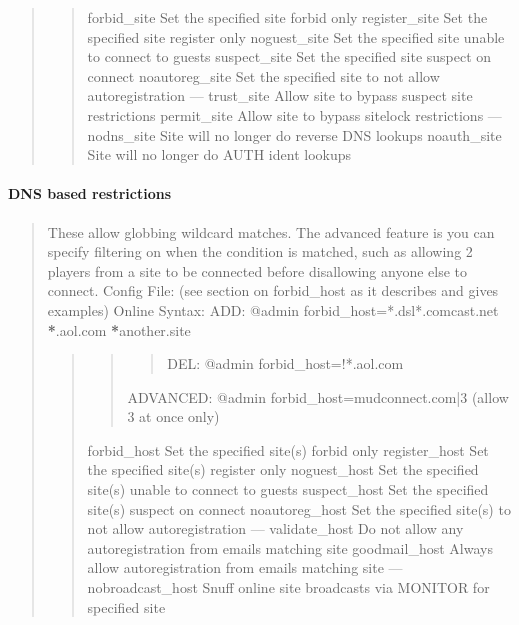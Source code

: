 \documentclass[letterpaper,10pt,english]{sphinxmanual}
\begin{document}
\begin{quote}
\begin{quote}
\begin{quote}
\begin{description}
\begin{description}
\end{description}

\end{description}
\end{quote}

\sphinxAtStartPar
forbid\_site      \sphinxhyphen{} Set the specified site forbid only
register\_site    \sphinxhyphen{} Set the specified site register only
noguest\_site     \sphinxhyphen{} Set the specified site unable to connect to guests
suspect\_site     \sphinxhyphen{} Set the specified site suspect on connect
noautoreg\_site   \sphinxhyphen{} Set the specified site to not allow autoregistration
—
trust\_site       \sphinxhyphen{} Allow site to bypass suspect site restrictions
permit\_site      \sphinxhyphen{} Allow site to bypass sitelock restrictions
—
nodns\_site       \sphinxhyphen{} Site will no longer do reverse DNS lookups
noauth\_site      \sphinxhyphen{} Site will no longer do AUTH ident lookups
\end{quote}
\end{quote}


\paragraph{DNS based restrictions}
\label{\detokenize{security:dns-based-restrictions}}\begin{quote}

\sphinxAtStartPar
These allow globbing wildcard matches.
The advanced feature is you can specify filtering on
when the condition is matched, such as allowing 2 players from a site to
be connected before disallowing anyone else to connect.
Config File: (see section on forbid\_host as it describes and gives examples)
Online Syntax: ADD: @admin forbid\_host=*.dsl*.comcast.net {\color{red}\bfseries{}*}.aol.com {\color{red}\bfseries{}*}another.site
\begin{quote}
\begin{quote}
\begin{quote}

\sphinxAtStartPar
DEL: @admin forbid\_host=!*.aol.com
\end{quote}

\sphinxAtStartPar
ADVANCED: @admin forbid\_host=mudconnect.com|3 (allow 3 at once only)
\end{quote}

\sphinxAtStartPar
forbid\_host     \sphinxhyphen{} Set the specified site(s) forbid only
register\_host   \sphinxhyphen{} Set the specified site(s) register only
noguest\_host    \sphinxhyphen{} Set the specified site(s) unable to connect to guests
suspect\_host    \sphinxhyphen{} Set the specified site(s) suspect on connect
noautoreg\_host  \sphinxhyphen{} Set the specified site(s) to not allow autoregistration
—
validate\_host   \sphinxhyphen{} Do not allow any autoregistration from emails matching site
goodmail\_host   \sphinxhyphen{} Always allow autoregistration from emails matching site
—
nobroadcast\_host \sphinxhyphen{} Snuff online site broadcasts via MONITOR for specified site
\end{quote}
\end{quote}
\end{document}
